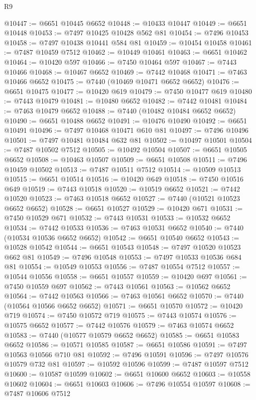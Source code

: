 \begin{lexlean}{R9}
\begin{coremodule}
@10447 := @6651 @10445 @6652
@10448 := @10433 @10447
@10449 := @6651 @10448
@10453 := @7497 @10425 @10428 @562 @81
@10454 := @7496 @10453
@10458 := @7497 @10438 @10441 @584 @81
@10459 := @10454 @10458
@10461 := @7487 @10459 @7512
@10462 := @10449 @10461
@10463 := @6651 @10462
@10464 := @10420 @597
@10466 := @7450 @10464 @597
@10467 := @7443 @10466
@10468 := @10467 @6652
@10469 := @7442 @10468
@10471 := @7463 @10466 @6652
@10475 := @7440 (@10469 @10471 @6652 @6652)
@10476 := @6651 @10475
@10477 := @10420 @619
@10479 := @7450 @10477 @619
@10480 := @7443 @10479
@10481 := @10480 @6652
@10482 := @7442 @10481
@10484 := @7463 @10479 @6652
@10488 := @7440 (@10482 @10484 @6652 @6652)
@10490 := @6651 @10488 @6652
@10491 := @10476 @10490
@10492 := @6651 @10491
@10496 := @7497 @10468 @10471 @610 @81
@10497 := @7496 @10496
@10501 := @7497 @10481 @10484 @632 @81
@10502 := @10497 @10501
@10504 := @7487 @10502 @7512
@10505 := @10492 @10504
@10507 := @6651 @10505 @6652
@10508 := @10463 @10507
@10509 := @6651 @10508
@10511 := @7496 @10459 @10502
@10513 := @7487 @10511 @7512
@10514 := @10509 @10513
@10515 := @6651 @10514
@10516 := @10420 @649
@10518 := @7450 @10516 @649
@10519 := @7443 @10518
@10520 := @10519 @6652
@10521 := @7442 @10520
@10523 := @7463 @10518 @6652
@10527 := @7440 (@10521 @10523 @6652 @6652)
@10528 := @6651 @10527
@10529 := @10420 @671
@10531 := @7450 @10529 @671
@10532 := @7443 @10531
@10533 := @10532 @6652
@10534 := @7442 @10533
@10536 := @7463 @10531 @6652
@10540 := @7440 (@10534 @10536 @6652 @6652)
@10542 := @6651 @10540 @6652
@10543 := @10528 @10542
@10544 := @6651 @10543
@10548 := @7497 @10520 @10523 @662 @81
@10549 := @7496 @10548
@10553 := @7497 @10533 @10536 @684 @81
@10554 := @10549 @10553
@10556 := @7487 @10554 @7512
@10557 := @10544 @10556
@10558 := @6651 @10557
@10559 := @10420 @697
@10561 := @7450 @10559 @697
@10562 := @7443 @10561
@10563 := @10562 @6652
@10564 := @7442 @10563
@10566 := @7463 @10561 @6652
@10570 := @7440 (@10564 @10566 @6652 @6652)
@10571 := @6651 @10570
@10572 := @10420 @719
@10574 := @7450 @10572 @719
@10575 := @7443 @10574
@10576 := @10575 @6652
@10577 := @7442 @10576
@10579 := @7463 @10574 @6652
@10583 := @7440 (@10577 @10579 @6652 @6652)
@10585 := @6651 @10583 @6652
@10586 := @10571 @10585
@10587 := @6651 @10586
@10591 := @7497 @10563 @10566 @710 @81
@10592 := @7496 @10591
@10596 := @7497 @10576 @10579 @732 @81
@10597 := @10592 @10596
@10599 := @7487 @10597 @7512
@10600 := @10587 @10599
@10602 := @6651 @10600 @6652
@10603 := @10558 @10602
@10604 := @6651 @10603
@10606 := @7496 @10554 @10597
@10608 := @7487 @10606 @7512

\end{coremodule}
\end{lexlean}
